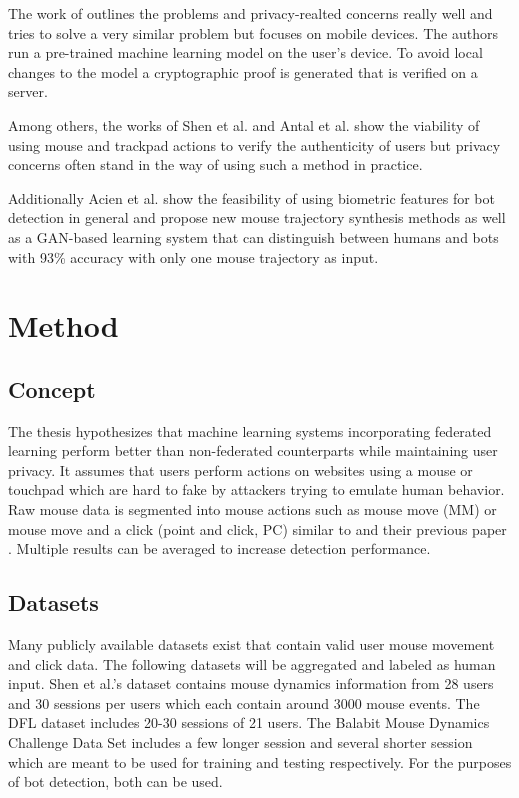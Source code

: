 \documentclass[
    fontsize=12pt,
    headings=small,
    parskip=half,           %
    bibliography=totoc,
    numbers=noenddot,       %
    open=any,               %
    final                   %
    ]{scrreprt}
\begin{document}
The work of \cite{PETS2021} outlines the problems and privacy-realted concerns really well and tries to solve a very similar problem but focuses on mobile devices. The authors run a pre-trained machine learning model on the user's device. To avoid local changes to the model a cryptographic proof is generated that is verified on a server.

Among others, the works of Shen et al. \cite{6263955} and Antal et al. \cite{9111596} \cite{DBLP:journals/corr/abs-1810-04668} show the viability of using mouse and trackpad actions to verify the authenticity of users but privacy concerns often stand in the way of using such a method in practice.

Additionally Acien et al. \cite{Acien2020BeCAPTCHAMouseSM} show the feasibility of using biometric features for bot detection in general and propose new mouse trajectory synthesis methods as well as a GAN-based learning system that can distinguish between humans and bots with 93\% accuracy with only one mouse trajectory as input.


\chapter{Method}

\section{Concept}

The thesis hypothesizes that machine learning systems incorporating federated learning perform better than non-federated counterparts while maintaining user privacy. It assumes that users perform actions on websites using a mouse or touchpad which are hard to fake by attackers trying to emulate human behavior. Raw mouse data is segmented into mouse actions such as mouse move (MM) or mouse move and a click (point and click, PC) similar to \cite{9111596} and their previous paper \cite{DBLP:journals/corr/abs-1810-04668}. Multiple results can be averaged to increase detection performance.

\section{Datasets}

Many publicly available datasets exist that contain valid user mouse movement and click data. The following datasets will be aggregated and labeled as human input.
Shen et al.'s \cite{6263955} dataset contains mouse dynamics information from 28 users and 30 sessions per users which each contain around 3000 mouse events.
The DFL dataset \cite{9111596} includes 20-30 sessions of 21 users.
The Balabit Mouse Dynamics Challenge Data Set \cite{BALABIT_CHALLENGE} includes a few longer session and several shorter session which are meant to be used for training and testing respectively. For the purposes of bot detection, both can be used.
\end{document}
